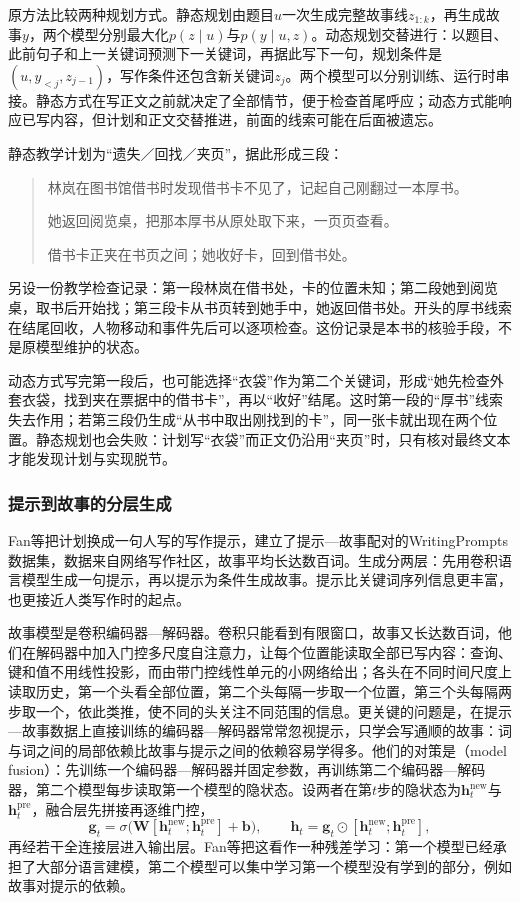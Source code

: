 原方法比较两种规划方式。静态规划由题目$u$一次生成完整故事线$z_{1:k}$，再生成故事$y$，两个模型分别最大化$p(z\mid u)$与$p(y\mid u,z)$。动态规划交替进行：以题目、此前句子和上一关键词预测下一关键词，再据此写下一句，规划条件是$(u,y_{<j},z_{j-1})$，写作条件还包含新关键词$z_j$。两个模型可以分别训练、运行时串接。静态方式在写正文之前就决定了全部情节，便于检查首尾呼应；动态方式能响应已写内容，但计划和正文交替推进，前面的线索可能在后面被遗忘。

静态教学计划为“遗失／回找／夹页”，据此形成三段：
\begin{quote}
林岚在图书馆借书时发现借书卡不见了，记起自己刚翻过一本厚书。

她返回阅览桌，把那本厚书从原处取下来，一页页查看。

借书卡正夹在书页之间；她收好卡，回到借书处。
\end{quote}
另设一份教学检查记录：第一段林岚在借书处，卡的位置未知；第二段她到阅览桌，取书后开始找；第三段卡从书页转到她手中，她返回借书处。开头的厚书线索在结尾回收，人物移动和事件先后可以逐项检查。这份记录是本书的核验手段，不是原模型维护的状态。

动态方式写完第一段后，也可能选择“衣袋”作为第二个关键词，形成“她先检查外套衣袋，找到夹在票据中的借书卡”，再以“收好”结尾。这时第一段的“厚书”线索失去作用；若第三段仍生成“从书中取出刚找到的卡”，同一张卡就出现在两个位置。静态规划也会失败：计划写“衣袋”而正文仍沿用“夹页”时，只有核对最终文本才能发现计划与实现脱节。

\subsubsection{提示到故事的分层生成}
\label{sec:nlp-generation-prompt-story}

Fan等把计划换成一句人写的写作提示，建立了提示—故事配对的WritingPrompts数据集，数据来自网络写作社区，故事平均长达数百词。生成分两层：先用卷积语言模型生成一句提示，再以提示为条件生成故事。提示比关键词序列信息更丰富，也更接近人类写作时的起点。

故事模型是卷积编码器—解码器。卷积只能看到有限窗口，故事又长达数百词，他们在解码器中加入门控多尺度自注意力，让每个位置能读取全部已写内容：查询、键和值不用线性投影，而由带门控线性单元的小网络给出；各头在不同时间尺度上读取历史，第一个头看全部位置，第二个头每隔一步取一个位置，第三个头每隔两步取一个，依此类推，使不同的头关注不同范围的信息。更关键的问题是，在提示—故事数据上直接训练的编码器—解码器常常忽视提示，只学会写通顺的故事：词与词之间的局部依赖比故事与提示之间的依赖容易学得多。他们的对策是（model fusion）：先训练一个编码器—解码器并固定参数，再训练第二个编码器—解码器，第二个模型每步读取第一个模型的隐状态。设两者在第$t$步的隐状态为$\bm h^{\mathrm{new}}_t$与$\bm h^{\mathrm{pre}}_t$，融合层先拼接再逐维门控，
\[
  \bm g_t=\sigma\bigl(\bm W[\bm h^{\mathrm{new}}_t;\bm h^{\mathrm{pre}}_t]+\bm b\bigr),\qquad
  \bm h_t=\bm g_t\odot[\bm h^{\mathrm{new}}_t;\bm h^{\mathrm{pre}}_t],
\]
再经若干全连接层进入输出层。Fan等把这看作一种残差学习：第一个模型已经承担了大部分语言建模，第二个模型可以集中学习第一个模型没有学到的部分，例如故事对提示的依赖。

